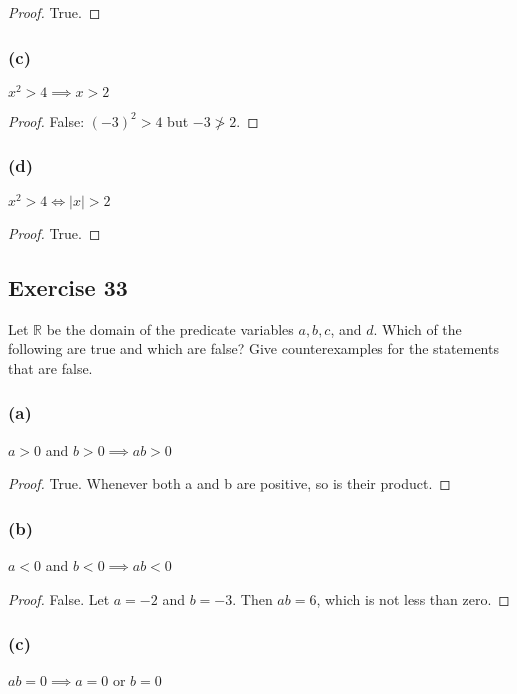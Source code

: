 \documentclass[14pt]{extarticle}
\newcommand{\R}{\mathbb{R}}
\begin{document}
\begin{proof}
    True.
\end{proof}

\subsubsection{(c)}
$x^2 > 4 \implies x > 2$

\begin{proof}
    False: $(-3)^2 > 4$ but $-3 \ngtr 2$.
\end{proof}

\subsubsection{(d)}
$x^2 > 4 \iff |x| > 2$

\begin{proof}
    True.
\end{proof}

\subsection{Exercise 33}
Let $\R$ be the domain of the predicate variables $a, b, c$, and $d$. Which of the following are true and which are false? Give counterexamples for the statements that are false.

\subsubsection{(a)}
$a > 0$ and $b > 0 \implies ab > 0$

\begin{proof}
    True. Whenever both a and b are positive, so is their product.
\end{proof}

\subsubsection{(b)}
$a < 0$ and $b < 0 \implies ab < 0$

\begin{proof}
    False. Let $a = -2$ and $b = -3$. Then $ab = 6$, which is not less than zero.
\end{proof}

\subsubsection{(c)}
$ab = 0 \implies a = 0$ or $b = 0$
\end{document}
